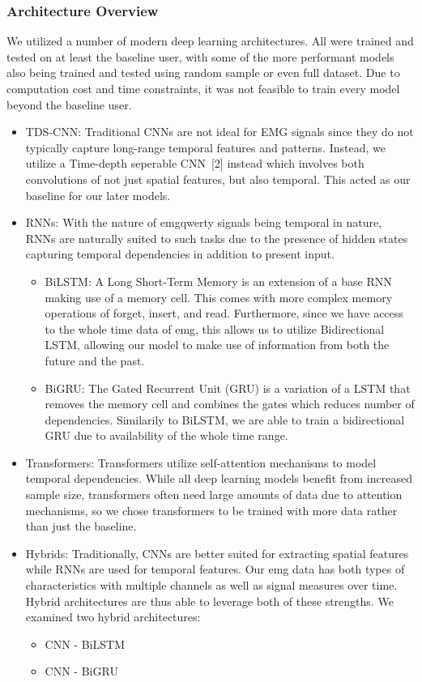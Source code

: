 \documentclass{article}
\begin{document}
\subsubsection{Architecture Overview}
We utilized a number of modern deep learning architectures. All were trained and tested on at least the baseline user, with some of the more performant models also being trained and tested using random sample or even full dataset. Due to computation cost and time constraints, it was not feasible to train every model beyond the baseline user.
\begin{itemize}
    \item TDS-CNN: Traditional CNNs are not ideal for EMG signals since they do not typically capture long-range temporal features and patterns. Instead, we utilize a Time-depth seperable CNN~[2] instead which involves both convolutions of not just spatial features, but also temporal. This acted as our baseline for our later models.
    \item RNNs: With the nature of emgqwerty signals being temporal in nature, RNNs are naturally suited to such tasks due to the presence of hidden states capturing temporal dependencies in addition to present input.
    \begin{itemize}
        \item BiLSTM: A Long Short-Term Memory is an extension of a base RNN making use of a memory cell. This comes with more complex memory operations of forget, insert, and read. Furthermore, since we have access to the whole time data of emg, this allows us to utilize Bidirectional LSTM, allowing our model to make use of information from both the future and the past.
        \item BiGRU: The Gated Recurrent Unit (GRU) is a variation of a LSTM that removes the memory cell and combines the gates which reduces number of dependencies. Similarily to BiLSTM, we are able to train a bidirectional GRU due to availability of the whole time range.
    \end{itemize}
    \item Transformers: Transformers utilize self-attention mechanisms to model temporal dependencies. While all deep learning models benefit from increased sample size, transformers often need large amounts of data due to attention mechanisms, so we chose transformers to be trained with more data rather than just the baseline.
    \item Hybrids: Traditionally, CNNs are better suited for extracting spatial features while RNNs are used for temporal features. Our emg data has both types of characteristics with multiple channels as well as signal measures over time. Hybrid architectures are thus able to leverage both of these strengths. We examined two hybrid architectures:
    \begin{itemize}
        \item CNN - BiLSTM
        \item CNN - BiGRU
    \end{itemize}
\end{itemize}
\end{document}
